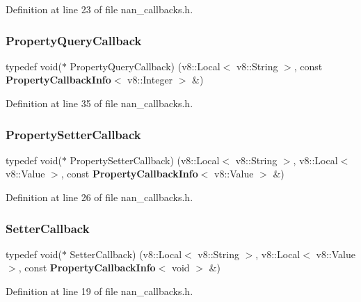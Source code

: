 Definition at line 23 of file nan\+\_\+callbacks.\+h.

\mbox{\label{nan__callbacks_8h_a498c40b44efef77f8650f830833858e9}} 
\subsubsection{Property\+Query\+Callback}
{\footnotesize\ttfamily typedef void($\ast$ Property\+Query\+Callback) (v8\+::\+Local$<$ v8\+::\+String $>$, const \textbf{ Property\+Callback\+Info}$<$ v8\+::\+Integer $>$ \&)}



Definition at line 35 of file nan\+\_\+callbacks.\+h.

\mbox{\label{nan__callbacks_8h_ac1c9a8159ab72a70425b35b6add4578e}} 
\subsubsection{Property\+Setter\+Callback}
{\footnotesize\ttfamily typedef void($\ast$ Property\+Setter\+Callback) (v8\+::\+Local$<$ v8\+::\+String $>$, v8\+::\+Local$<$ v8\+::\+Value $>$, const \textbf{ Property\+Callback\+Info}$<$ v8\+::\+Value $>$ \&)}



Definition at line 26 of file nan\+\_\+callbacks.\+h.

\mbox{\label{nan__callbacks_8h_a1cb8e08feb5bf4c01283eaeff8b704ec}} 
\subsubsection{Setter\+Callback}
{\footnotesize\ttfamily typedef void($\ast$ Setter\+Callback) (v8\+::\+Local$<$ v8\+::\+String $>$, v8\+::\+Local$<$ v8\+::\+Value $>$, const \textbf{ Property\+Callback\+Info}$<$ void $>$ \&)}



Definition at line 19 of file nan\+\_\+callbacks.\+h.

